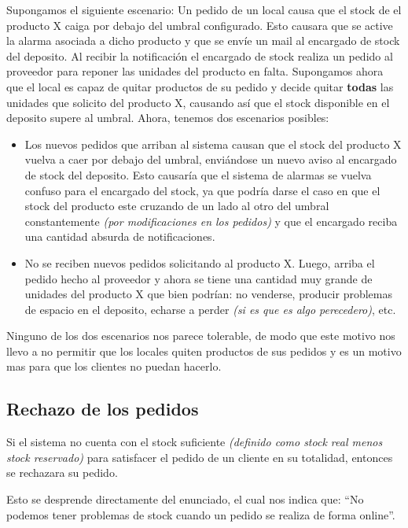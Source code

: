 Supongamos el siguiente escenario: Un pedido de un local causa que el stock de el producto X caiga por debajo del umbral configurado. Esto causara que se active la alarma asociada a dicho producto y que se envíe un mail al encargado de stock del deposito. Al recibir la notificación el encargado de stock realiza un pedido al proveedor para reponer las unidades del producto en falta. Supongamos ahora que el local es capaz de quitar productos de su pedido y decide quitar \textbf{todas} las unidades que solicito del producto X, causando así que el stock disponible en el deposito supere al umbral. Ahora, tenemos dos escenarios posibles:
\begin{itemize}
	\item Los nuevos pedidos que arriban al sistema causan que el stock del producto X vuelva a caer por debajo del umbral, enviándose un nuevo aviso al encargado de stock del deposito. Esto causaría que el sistema de alarmas se vuelva confuso para el encargado del stock, ya que podría darse el caso en que el stock del producto este cruzando de un lado al otro del umbral constantemente \textit{(por modificaciones en los pedidos)} y que el encargado reciba una cantidad absurda de notificaciones.
	\item No se reciben nuevos pedidos solicitando al producto X. Luego, arriba el pedido hecho al proveedor y ahora se tiene una cantidad muy grande de unidades del producto X que bien podrían: no venderse, producir problemas de espacio en el deposito, echarse a perder \textit{(si es que es algo perecedero)}, etc.
\end{itemize}

Ninguno de los dos escenarios nos parece tolerable, de modo que este motivo nos llevo a no permitir que los locales quiten productos de sus pedidos y es un motivo mas para que los clientes no puedan hacerlo.
 
\subsection{Rechazo de los pedidos}

Si el sistema no cuenta con el stock suficiente \textit{(definido como stock real menos stock reservado)} para satisfacer el pedido de un cliente en su totalidad, entonces se rechazara su pedido.

Esto se desprende directamente del enunciado, el cual nos indica que: ``No podemos tener problemas de stock cuando un pedido se realiza de forma online''.

